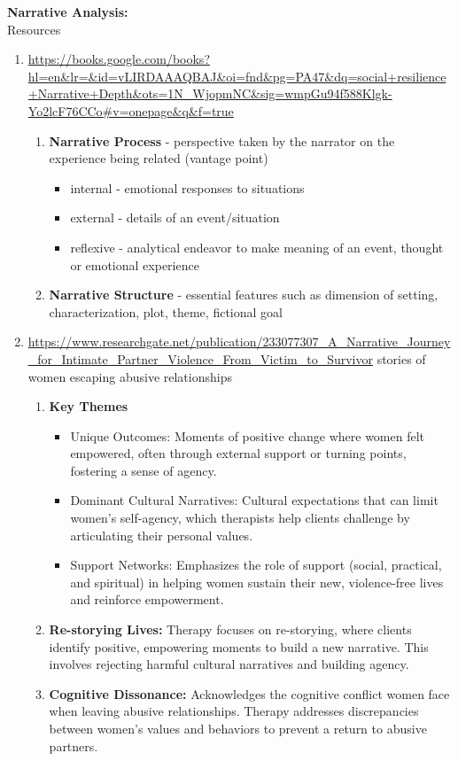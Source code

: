 \documentclass[letterpaper, 10pt]{article}
\begin{document}
\textbf{Narrative Analysis: } \\
Resources
\begin{enumerate}
    \item \url{https://books.google.com/books?hl=en&lr=&id=vLIRDAAAQBAJ&oi=fnd&pg=PA47&dq=social+resilience+Narrative+Depth&ots=1N_WjopmNC&sig=wmpGu94f588Klgk-Yo2lcF76CCo#v=onepage&q&f=true}
    \begin{enumerate}
        \item \textbf{Narrative Process} - perspective taken by the narrator on the experience being related (vantage point)
        \begin{itemize}
            \item internal - emotional responses to situations
            \item external - details of an event/situation
            \item reflexive - analytical endeavor to make meaning of an event, thought or emotional experience
        \end{itemize}
        \item \textbf{Narrative Structure} - essential features such as dimension of setting, characterization, plot, theme, fictional goal 
    \end{enumerate}
    \item \url{https://www.researchgate.net/publication/233077307_A_Narrative_Journey_for_Intimate_Partner_Violence_From_Victim_to_Survivor} stories of women escaping abusive relationships
    \begin{enumerate} 
        \item \textbf{Key Themes}
        \begin{itemize}
            \item Unique Outcomes: Moments of positive change where women felt empowered, often through external support or turning points, fostering a sense of agency.
            \item Dominant Cultural Narratives: Cultural expectations that can limit women's self-agency, which therapists help clients challenge by articulating their personal values.
            \item Support Networks: Emphasizes the role of support (social, practical, and spiritual) in helping women sustain their new, violence-free lives and reinforce empowerment.
        \end{itemize} 
        \item \textbf{Re-storying Lives:} Therapy focuses on re-storying, where clients identify positive, empowering moments to build a new narrative. This involves rejecting harmful cultural narratives and building agency.
        \item \textbf{Cognitive Dissonance:} Acknowledges the cognitive conflict women face when leaving abusive relationships. Therapy addresses discrepancies between women’s values and behaviors to prevent a return to abusive partners.
    \end{enumerate}


\end{enumerate}
\end{document}
